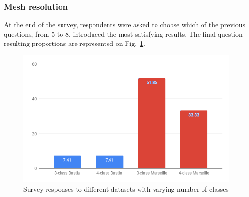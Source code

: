 \documentclass{kththesis}
\begin{document}



\subsubsection{Mesh resolution}
At the end of the survey, respondents were asked to choose which of the previous questions, from 5 to 8, introduced the most satisfying results. The final question resulting proportions are represented on Fig.~\ref{fig:Q9_rep}. 

\begin{figure}[H]
\includegraphics[width=\textwidth]{images/Results/MRF_survey/Q9.png}
\caption{Survey responses to different datasets with varying number of classes}
\label{fig:Q9_rep}
\end{figure}
\end{document}
